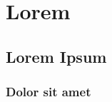 \chapter{Lorem}

\lipsum[1]

\section{Lorem Ipsum}

    \lipsum[2-4]

    \subsection{Dolor sit amet}

        \lipsum[5-7]